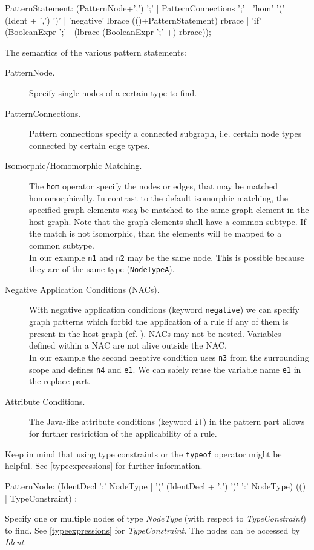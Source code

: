 \begin{rail}  
  PatternStatement: (PatternNode+',') ';' |
    PatternConnections ';' |
    'hom' '(' (Ident + ',') ')' |
    'negative' lbrace (()+PatternStatement) rbrace |
    'if' (BooleanExpr ';' | (lbrace (BooleanExpr ';' +) rbrace));
\end{rail}
The semantics of the various pattern statements:
\begin{description}
  \item[PatternNode.] Specify single nodes of a certain type to find.
  \item[PatternConnections.] Pattern connections specify a connected subgraph, i.e. certain node types connected by certain edge types.
  \item[Isomorphic/Homomorphic Matching.] The \texttt{hom} operator specify the nodes or edges, that may be matched homomorphically. In contrast to the default isomorphic matching, the specified graph elements \emph{may} be matched to the same graph element in the host graph. Note that the graph elements shall have a common subtype. If the match is not isomorphic, than the elements will be mapped to a common subtype.\\
  In our example \texttt{n1} and \texttt{n2} may be the same node. This is possible because they are of the  same type (\texttt{NodeTypeA}).
  \item[Negative Application Conditions (NACs).] With negative application conditions (keyword \texttt{negative}) we can specify graph patterns which forbid the application of a rule if any of them is present in the host graph (cf. \cite{adam}). NACs may not be nested. Variables defined within a NAC are not alive outside the NAC.\\
  In our example the second negative condition uses \texttt{n3} from the surrounding scope and defines \texttt{n4} and \texttt{e1}. We can safely reuse the variable name \texttt{e1} in the replace part.
  \item[Attribute Conditions.] The Java-like attribute conditions (keyword \texttt{if}) in the pattern part allows for further restriction of the applicability of a rule.
\end{description}
Keep in mind that using type constraints or the \texttt{typeof} operator might be helpful. See \ref{typeexpressions} for further information.

\begin{rail}   
  PatternNode: (IdentDecl ':' NodeType 
    | '(' (IdentDecl + ',') ')' ':' NodeType) 
     (() | TypeConstraint) ; 
\end{rail}
Specify one or multiple nodes of type \emph{NodeType} (with respect to \emph{TypeConstraint}) to find. See \ref{typeexpressions} for \emph{TypeConstraint}. The nodes can be accessed by \emph{Ident}.

